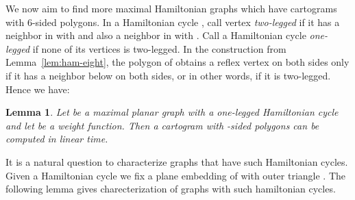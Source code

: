 \documentclass[11pt]{article}
\newtheorem{lemma}{Lemma}[section]
\begin{document}
We now aim to find more maximal Hamiltonian graphs which have cartograms with 6-sided polygons.
In a Hamiltonian cycle , call vertex
 {\em two-legged} if it has a neighbor  in 
with  and also a neighbor  in  with .
Call a Hamiltonian cycle {\em one-legged} if none of its vertices
is two-legged.
In the construction from Lemma~\ref{lem:ham-eight}, the polygon of 
obtains a reflex vertex on both sides only if it has a neighbor below
 on both sides, or in other words, if it is two-legged.
Hence we have:

\begin{lemma}\label{lem:6-sided}
  Let  be a maximal planar graph with a one-legged Hamiltonian
  cycle and let  be a weight function. Then a
  cartogram with -sided polygons can be computed in linear time.
\end{lemma}

It is a natural question to characterize graphs that have such
Hamiltonian cycles. Given a Hamiltonian cycle  we fix a
plane embedding of  with outer triangle .
The following lemma gives charecterization of graphs with such hamiltonian cycles.
\end{document}
